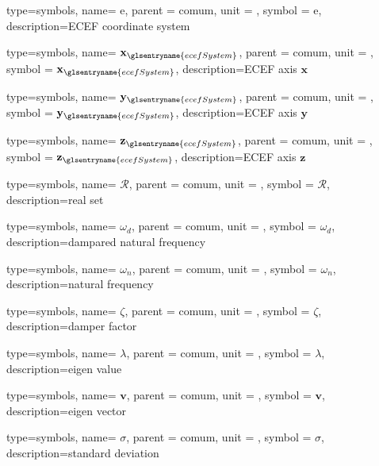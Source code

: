 
{type=symbols,
	name= \ensuremath{\mathrm{e}},
	parent = {comum},
	unit = \unexpanded{},
	symbol = \ensuremath{\mathrm{e}},
	description={ECEF coordinate system}
}

{type=symbols,
name= \ensuremath{\mathbf{x}_{\glsentryname{ecefSystem}}},
parent = {comum},
unit = \unexpanded{},
symbol = \ensuremath{\mathbf{x}_{\glsentryname{ecefSystem}}},
description={ECEF axis $\mathbf{x}$}
}

{type=symbols,
name= \ensuremath{\mathbf{y}_{\glsentryname{ecefSystem}}},
parent = {comum},
unit = \unexpanded{},
symbol = \ensuremath{\mathbf{y}_{\glsentryname{ecefSystem}}},
description={ECEF axis $\mathbf{y}$}
}

{type=symbols,
name= \ensuremath{\mathbf{z}_{\glsentryname{ecefSystem}}},
parent = {comum},
unit = \unexpanded{},
symbol = \ensuremath{\mathbf{z}_{\glsentryname{ecefSystem}}},
description={ECEF axis $\mathbf{z}$}
}



{type=symbols,
	name= \ensuremath{\mathcal{R}},
	parent = {comum},
	unit = \unexpanded{},
	symbol = \ensuremath{\mathcal{R}},
	description={real set}
}


{type=symbols,
	name= \ensuremath{\omega_{d}},
	parent = {comum},
	unit = \unexpanded{\si{\radian\per\second}},
	symbol = \ensuremath{\omega_{d}},
	description={dampared natural frequency}
}

{type=symbols,
	name= \ensuremath{\omega_{n}},
	parent = {comum},
	unit = \unexpanded{\si{\radian\per\second}},
	symbol = \ensuremath{\omega_{n}},
	description={natural frequency}
}

{type=symbols,
	name= \ensuremath{\zeta},
	parent = {comum},
	unit = \unexpanded{},
	symbol = \ensuremath{\zeta},
	description={damper factor}
}

{type=symbols,
	name= \ensuremath{\lambda},
	parent = {comum},
	unit = \unexpanded{},
	symbol = \ensuremath{\lambda},
	description={eigen value}
}

{type=symbols,
	name= \ensuremath{\mathbf{v}},
	parent = {comum},
	unit = \unexpanded{},
	symbol = \ensuremath{\mathbf{v}},
	description={eigen vector}
}

{type=symbols,
	name= \ensuremath{\sigma},
	parent = {comum},
	unit = \unexpanded{},
	symbol = \ensuremath{\sigma},
	description={standard deviation}
}
